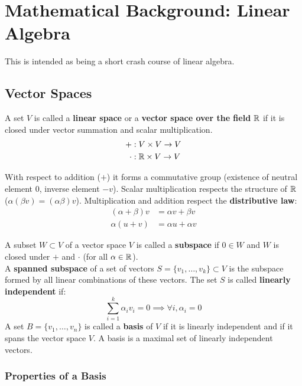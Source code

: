 \section{Mathematical Background: Linear Algebra}
\label{sec:linear_algebra}

This is intended as being a short crash course of linear algebra.

\subsection{Vector Spaces}
\label{sub:vector_spaces}

A set $V$ is called a \textbf{linear space}
or a \textbf{vector space over the field} $\mathbb{R}$
if it is closed under vector summation and scalar multiplication.
\begin{align*}
	+ &: V \times V \rightarrow V \\
	\cdot &: \mathbb{R} \times V \rightarrow V
\end{align*}

\noindent
With respect to addition ($+$) it forms a commutative group
(existence of neutral element $0$, inverse element $-v$).
Scalar multiplication respects the structure of $\mathbb{R}$ 
($\alpha(\beta v) = (\alpha \beta )v$).
Multiplication and addition respect the \textbf{distributive law}:
\begin{align*}
	( \alpha + \beta )v &= \alpha v + \beta v \\
	\alpha (u + v) & = \alpha u + \alpha v
\end{align*}

\noindent
A subset $W \subset V$ of a vector space $V$
is called a \textbf{subspace} if $0 \in W$ and
$W$ is closed under $+$ and $\cdot$ (for all $\alpha \in \mathbb{R}$).\\

\noindent
A \textbf{spanned subspace} of a set of vectors
$S = \{v_1, \hdots, v_k\} \subset V$ is the subspace
formed by all linear combinations of these vectors.
The set $S$ is called \textbf{linearly independent} if:
\[
	\sum_{i=1}^k \alpha_i v_i = 0 \implies \forall i, \alpha_i = 0
\]
\noindent
A set $B = \{v_1, \hdots, v_n\}$ is called
a \textbf{basis} of $V$ if it is linearly independent and if it
spans the vector space $V$.
A basis is a maximal set of linearly independent vectors.


\subsubsection{Properties of a Basis}
\label{ssub:properties_of_a_basis}

